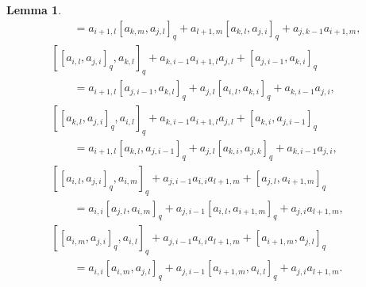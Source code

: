 \documentclass[pdftex]{sigma}
\numberwithin{equation}{section}
\def\lr#1{\left[#1\right]}
\newtheorem{Lemma}[Theorem]{Lemma}
\begin{document}
\begin{Lemma}
\begin{gather}
 \qquad= a_{i+1,l}\lr{a_{k,m}, a_{j,l}}_q +a_{l+1,m}\lr{a_{k,l}, a_{j,i}}_q +a_{j,k-1}a_{i+1,m}, \tag{4.b} \label{eqn:4b} \\
 [\lr{a_{i,l}, a_{j,i}}_q, a_{k,l}]_q+a_{k,i-1}a_{i+1,l}a_{j,l}+\lr{a_{j,i-1}, a_{k,i}}_q \nonumber \\
 \qquad = a_{i+1,l}\lr{a_{j,i-1}, a_{k,l}}_q +a_{j,l}\lr{a_{i,l}, a_{k,i}}_q+a_{k,i-1}a_{j,i}, \tag{5.a} \\
 [\lr{a_{k,l}, a_{j,i}}_q, a_{i,l}]_q+a_{k,i-1}a_{i+1,l}a_{j,l}+\lr{a_{k,i}, a_{j,i-1}}_q \nonumber \\
 \qquad = a_{i+1,l}\lr{a_{k,l}, a_{j,i-1}}_q+a_{j,l}\lr{a_{k,i}, a_{j,k}}_q+a_{k,i-1}a_{j,i}, \tag{5.b} \\
 [\lr{a_{i,l}, a_{j,i}}_q, a_{i,m}]_q+a_{j,i-1}a_{i,i}a_{l+1,m} +\lr{a_{j,l}, a_{i+1,m} }_q\nonumber \\
 \qquad = a_{i,i}\lr{a_{j,l}, a_{i,m}}_q +a_{j,i-1}\lr{a_{i,l}, a_{i+1,m}}_q+a_{j,i}a_{l+1,m}, \tag{6.a} \label{eqn:6a}\\
 [\lr{a_{i,m}, a_{j,i}}_q, a_{i,l}]_q+a_{j,i-1}a_{i,i}a_{l+1,m} +\lr{a_{i+1,m}, a_{j,l}}_q \nonumber \\
 \qquad = a_{i,i}\lr{a_{i,m}, a_{j,l}}_q+a_{j,i-1}\lr{a_{i+1,m}, a_{i,l}}_q+a_{j,i}a_{l+1,m}. \tag{6.b} \label{eqn:6b}
\end{gather}
\end{Lemma}
\end{document}

